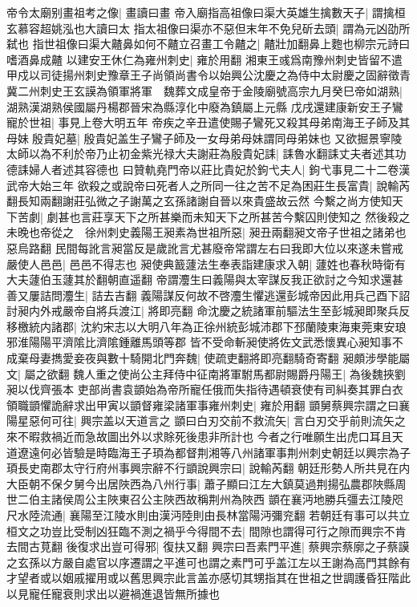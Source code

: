 帝令太廟别畫祖考之像|{
	畫讀曰畫}
帝入廟指高祖像曰渠大英雄生擒數天子|{
	謂擒桓玄慕容超姚泓也大讀曰太}
指太祖像曰渠亦不惡但末年不免兒斫去頭|{
	謂為元凶劭所弑也}
指世祖像曰渠大齄鼻如何不齄立召畫工令齄之|{
	齄壯加翻鼻上麭也柳宗元詩曰嗜酒鼻成齄}
以建安王休仁為雍州刺史|{
	雍於用翻}
湘東王彧爲南豫州刺史皆留不遣　甲戍以司徒揚州刺史豫章王子尚領尚書令以始興公沈慶之為侍中太尉慶之固辭徵青冀二州刺史王玄謨為領軍將軍　魏葬文成皇帝于金陵廟號高宗九月癸巳帝如湖熟|{
	湖熟漢湖熟侯國屬丹楊郡晉宋為縣淳化中廢為鎮屬上元縣}
戊戌還建康新安王子鸞寵於世祖|{
	事見上卷大明五年}
帝疾之辛丑遣使賜子鸞死又殺其母弟南海王子師及其母妹殷貴妃墓|{
	殷貴妃盖生子鸞子師及一女母弟母妹謂同母弟妹也}
又欲掘景寧陵太師以為不利於帝乃止初金紫光禄大夫謝莊為殷貴妃誄|{
	誄魯水翻誄丈夫者述其功德誄婦人者述其容德也}
曰贊軌堯門帝以莊比貴妃於鉤弋夫人|{
	鉤弋事見二十二卷漢武帝大始三年}
欲殺之或說帝曰死者人之所同一往之苦不足為困莊生長富貴|{
	說輸芮翻長知兩翻謝莊弘微之子謝萬之玄孫諸謝自晉以來貴盛故云然}
今繫之尚方使知天下苦劇|{
	劇甚也言莊享天下之所甚樂而未知天下之所甚苦今繫囚則使知之}
然後殺之未晚也帝從之　徐州刺史義陽王昶素為世祖所惡|{
	昶丑兩翻昶文帝子世祖之諸弟也惡烏路翻}
民間每訛言昶當反是歲訛言尤甚廢帝常謂左右曰我即大位以來遂未嘗戒嚴使人邑邑|{
	邑邑不得志也}
昶使典籖蘧法生奉表詣建康求入朝|{
	蘧姓也春秋時衛有大夫蘧伯玉蘧其於翻朝直遥翻}
帝謂灋生曰義陽與太宰謀反我正欲討之今知求還甚善又屢詰問灋生|{
	詰去吉翻}
義陽謀反何故不啓灋生懼逃還彭城帝因此用兵己酉下詔討昶内外戒嚴帝自將兵渡江|{
	將即亮翻}
命沈慶之統諸軍前驅法生至彭城昶即聚兵反移檄統内諸郡|{
	沈約宋志以大明八年為正徐州統彭城沛郡下邳蘭陵東海東莞東安琅邪淮陽陽平濟隂比濟隂鍾離馬頭等郡}
皆不受命斬昶使將佐文武悉懷異心昶知事不成棄母妻擕愛妾夜與數十騎開北門奔魏|{
	使疏吏翻將即亮翻騎奇寄翻}
昶頗涉學能屬文|{
	屬之欲翻}
魏人重之使尚公主拜侍中征南將軍駙馬都尉賜爵丹陽王|{
	為後魏挾劉昶以伐齊張本}
吏部尚書袁顗始為帝所寵任俄而失指待遇頓衰使有司糾奏其罪白衣領職顗懼詭辭求出甲寅以顗督雍梁諸軍事雍州刺史|{
	雍於用翻}
顗舅蔡興宗謂之曰襄陽星惡何可往|{
	興宗盖以天道言之}
顗曰白刃交前不救流矢|{
	言白刃交乎前則流矢之來不暇救禍近而急故圖出外以求賖死後患非所計也}
今者之行唯願生出虎口耳且天道遼遠何必皆驗是時臨海王子頊為都督荆湘等八州諸軍事荆州刺史朝廷以興宗為子頊長史南郡太守行府州事興宗辭不行顗說興宗曰|{
	說輸芮翻}
朝廷形勢人所共見在内大臣朝不保夕舅今出居陜西為八州行事|{
	蕭子顯曰江左大鎮莫過荆揚弘農郡陜縣周世二伯主諸侯周公主陜東召公主陜西故稱荆州為陜西}
顗在襄沔地勝兵彊去江陵咫尺水陸流通|{
	襄陽至江陵水則由漢沔陸則由長林當陽沔彌兖翻}
若朝廷有事可以共立桓文之功豈比受制凶狂臨不測之禍乎今得間不去|{
	間隙也謂得可行之隙而興宗不肯去間古莧翻}
後復求出豈可得邪|{
	復扶又翻}
興宗曰吾素門平進|{
	蔡興宗蔡廓之子蔡謨之玄孫以方嚴自處官以序遷謂之平進可也謂之素門可乎盖江左以王謝為高門其餘有才望者或以姻戚擢用或以舊思興宗此言盖亦感切其甥指其在世祖之世調護昏狂階此以見寵任寵衰則求出以避禍進退皆無所據也}

